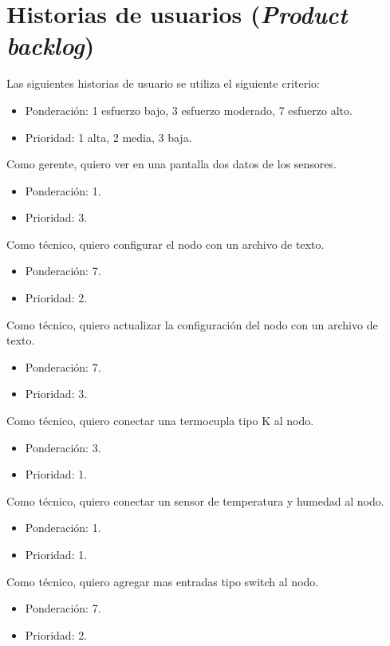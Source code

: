 \documentclass[11pt]{charter}
\begin{document}
\section{Historias de usuarios (\textit{Product backlog})}
\label{sec:backlog}
Las siguientes historias de usuario se utiliza el siguiente criterio:
\begin{itemize}
\item Ponderación: 1 esfuerzo bajo, 3 esfuerzo moderado, 7 esfuerzo alto.
\item Prioridad: 1 alta, 2 media, 3 baja.
\end{itemize}

Como gerente, quiero ver en una pantalla dos datos de los sensores.
\begin{itemize}
\item Ponderación: 1.
\item Prioridad: 3.
\end{itemize}

Como técnico, quiero configurar el nodo con un archivo de texto.
\begin{itemize}
\item Ponderación: 7.
\item Prioridad: 2.
\end{itemize}

Como técnico, quiero actualizar la configuración del nodo con un archivo de texto.
\begin{itemize}
\item Ponderación: 7.
\item Prioridad: 3.
\end{itemize}

Como técnico, quiero conectar una termocupla tipo K al nodo.
\begin{itemize}
\item Ponderación: 3.
\item Prioridad: 1.
\end{itemize}

Como técnico, quiero conectar un sensor de temperatura y humedad al nodo.
\begin{itemize}
\item Ponderación: 1.
\item Prioridad: 1.
\end{itemize}

Como técnico, quiero agregar mas entradas tipo switch al nodo.
\begin{itemize}
\item Ponderación: 7.
\item Prioridad: 2.
\end{itemize}
\end{document}
